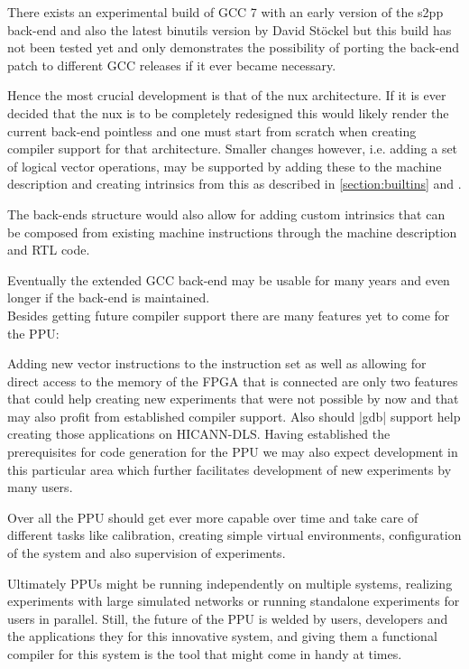 There exists an experimental build of GCC 7 with an early version of the s2pp back-end and also the latest binutils version by David Stöckel but this build has not been tested yet and only demonstrates the possibility of porting the back-end patch to different GCC releases if it ever became necessary.

Hence the most crucial development is that of the nux architecture.
If it is ever decided that the nux is to be completely redesigned this would likely render the current back-end pointless and one must start from scratch when creating compiler support for that architecture.
Smaller changes however, i.e. adding a set of logical vector operations, may be supported by adding these to the machine description and creating intrinsics from this as described in \ref{section:builtins} and \citep{heimbrecht}.

The back-ends structure would also allow for adding custom intrinsics that can be composed from existing machine instructions through the machine description and RTL code.

Eventually the extended GCC back-end may be usable for many years and even longer if the back-end is maintained.
\\
Besides getting future compiler support there are many features yet to come for the PPU:

Adding new vector instructions to the instruction set as well as allowing for direct access to the memory of the FPGA that is connected are only two features that could help creating new experiments that were not possible by now and that may also profit from established compiler support.
Also should |gdb| support help creating those applications on HICANN-DLS.
Having established the prerequisites for code generation for the PPU we may also expect development in this particular area which further facilitates development of new experiments by many users.

Over all the PPU should get ever more capable over time and take care of different tasks like calibration, creating simple virtual environments, configuration of the system and also supervision of experiments.

Ultimately PPUs might be running independently on multiple systems, realizing experiments with large simulated networks or running standalone experiments for users in parallel.
Still, the future of the PPU is welded by users, developers and the applications they for this innovative system, and giving them a functional compiler for this system is the tool that might come in handy at times.
